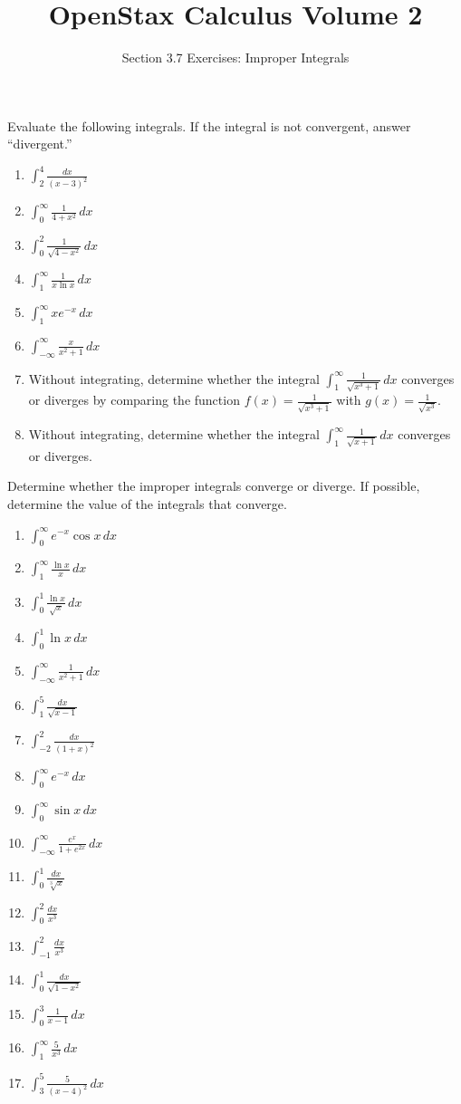\documentclass{exercises}
\title{OpenStax Calculus Volume 2}
\subtitle{Section 3.7 Exercises: Improper Integrals}
\author{}
\date{}
\begin{document}
\maketitle


Evaluate the following integrals. If the integral is not convergent, answer ``divergent.''

\begin{enumerate}[start=1]
\item $\int_{2}^{4}\frac{dx}{{(x-3)}^{2}}$
\item $\int_{0}^{\infty}\frac{1}{4+x^{2}}\,dx$
\item $\int_{0}^{2}\frac{1}{\sqrt{4-x^{2}}}\,dx$
\item $\int_{1}^{\infty}\frac{1}{x\ln x}\,dx$
\item $\int_{1}^{\infty}xe^{-x}\,dx$
\item $\int_{-\infty}^{\infty}\frac{x}{x^{2}+1}\,dx$
\item Without integrating, determine whether the integral $\int_{1}^{\infty}\frac{1}{\sqrt{x^{3}+1}}\,dx$ converges or diverges by comparing the function $f(x)=\frac{1}{\sqrt{x^{3}+1}}$ with $g(x)=\frac{1}{\sqrt{x^{3}}}$.
\item Without integrating, determine whether the integral $\int_{1}^{\infty}\frac{1}{\sqrt{x+1}}\,dx$ converges or diverges.
\end{enumerate}

Determine whether the improper integrals converge or diverge. If possible, determine the value of the integrals that converge.

\begin{enumerate}[resume]
\item $\int_{0}^{\infty}e^{-x}\cos x\,dx$
\item $\int_{1}^{\infty}\frac{\ln x}{x}\,dx$
\item $\int_{0}^{1}\frac{\ln x}{\sqrt{x}}\,dx$
\item $\int_{0}^{1}\ln x\,dx$
\item $\int_{-\infty}^{\infty}\frac{1}{x^{2}+1}\,dx$
\item $\int_{1}^{5}\frac{dx}{\sqrt{x-1}}$
\item $\int_{-2}^{2}\frac{dx}{{(1+x)}^{2}}$
\item $\int_{0}^{\infty}e^{-x}\,dx$
\item $\int_{0}^{\infty}\sin x\,dx$
\item $\int_{-\infty}^{\infty}\frac{e^{x}}{1+e^{2x}}\,dx$
\item $\int_{0}^{1}\frac{dx}{\sqrt[3]{x}}$
\item $\int_{0}^{2}\frac{dx}{x^{3}}$
\item $\int_{-1}^{2}\frac{dx}{x^{3}}$
\item $\int_{0}^{1}\frac{dx}{\sqrt{1-x^{2}}}$
\item $\int_{0}^{3}\frac{1}{x-1}\,dx$
\item $\int_{1}^{\infty}\frac{5}{x^{3}}\,dx$
\item $\int_{3}^{5}\frac{5}{{(x-4)}^{2}}\,dx$
\end{enumerate}
\end{document}

